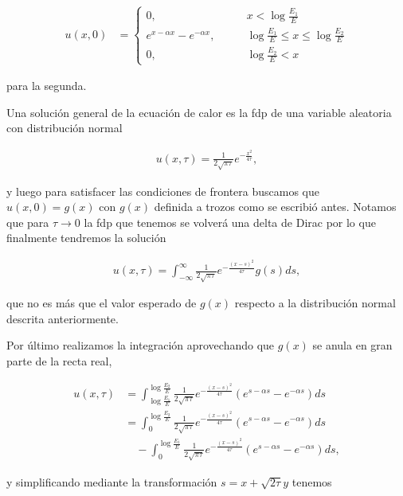 \documentclass[letter]{article}
\begin{document}
\begin{enumerate}
\begin{enumerate}[label=\alph*)]
\begin{align*}
    u(x,0) &= \begin{cases}
                0, &\qquad x < \log\frac{E_1}{E}\\
                e^{x - \alpha x} - e^{-\alpha x}, &\qquad \log\frac{E_1}{E} \leq x \leq \log\frac{E_2}{E}\\
                0, &\qquad \log\frac{E_2}{E} < x
              \end{cases}
\end{align*}

para la segunda.

Una solución general de la ecuación de calor es la fdp de una variable aleatoria con distribución normal

\begin{align*}
    u(x,\tau) = \frac{1}{2\sqrt{\pi\tau}}e^{-\frac{x^2}{4\tau}},
\end{align*}

y luego para satisfacer las condiciones de frontera buscamos que $u(x,0) = g(x)$ con $g(x)$ definida a trozos como se escribió antes. Notamos que para $\tau \to 0$ la fdp que tenemos se volverá una delta de Dirac por lo que finalmente tendremos la solución

\begin{align*}
    u(x,\tau) = \int_{-\infty}^\infty \frac{1}{2\sqrt{\pi\tau}}e^{-\frac{(x - s)^2}{4\tau}}g(s)ds,
\end{align*}

que no es más que el valor esperado de $g(x)$ respecto a la distribución normal descrita anteriormente.

Por último realizamos la integración aprovechando que $g(x)$ se anula en gran parte de la recta real,

\begin{align*}
    u(x,\tau) &= \int_{\log\frac{E_1}{E}}^{\log\frac{E_2}{E}} \frac{1}{2\sqrt{\pi\tau}}e^{-\frac{(x - s)^2}{4\tau}}(e^{s - \alpha s} - e^{-\alpha s})ds\\
    &= \int_0^{\log\frac{E_2}{E}} \frac{1}{2\sqrt{\pi\tau}}e^{-\frac{(x - s)^2}{4\tau}}(e^{s - \alpha s} - e^{-\alpha s})ds\\
    &\quad - \int_0^{\log\frac{E_1}{E}} \frac{1}{2\sqrt{\pi\tau}}e^{-\frac{(x - s)^2}{4\tau}}(e^{s - \alpha s} - e^{-\alpha s})ds,
\end{align*}

y simplificando mediante la transformación $s = x + \sqrt{2\tau}y$ tenemos


\end{enumerate}
\end{enumerate}
\end{document}
